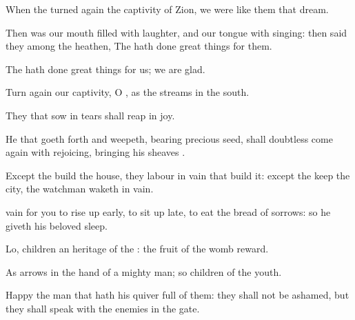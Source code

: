 {\Q {}When the
{} turned
again the
captivity of
Zion, we were like them that
dream.


\par }{\Q {}Then was our
mouth
filled with
laughter, and our
tongue with
singing: then
said they among the
heathen, The
{} hath
done great
things for them.


\par }{\Q {}The
{} hath
done great
things for us;
{} we are
glad.


\par }{\BB \par }
{\Q {}Turn
again our
captivity, O
{}, as the
streams in the
south.


\par }{\Q {}They that
sow in
tears shall
reap in
joy.


\par }{\Q {}He that
goeth
forth and
weepeth,
bearing
precious
seed, shall
doubtless
come again with
rejoicing,
bringing his
sheaves
{}.




\par }
{\Q {}Except the
{}
build the
house, they
labour in
vain that
build it: except the
{}
keep the
city, the
watchman
waketh
{} in
vain.


\par }{\Q {}
vain for you to rise
up
early, to sit
up
late, to
eat the
bread of
sorrows:
{} so he
giveth his
beloved
sleep.


\par }{\Q {}Lo,
children
{} an
heritage of the
{}:
{} the
fruit of the
womb
{}
reward.


\par }{\Q {}As
arrows
{} in the
hand of a mighty
man; so
{}
children of the
youth.


\par }{\Q {}Happy
{} the
man that hath his
quiver
full of them: they shall not be
ashamed, but they shall
speak with the
enemies in the
gate.




\par }
